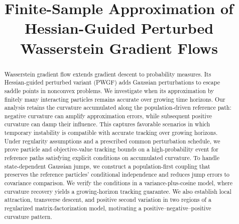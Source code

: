 \documentclass[11pt,a4paper]{article}
\title{Finite-Sample Approximation of Hessian-Guided Perturbed Wasserstein Gradient Flows}
\author{}
\date{}
\begin{document}
\maketitle

\begin{abstract}
Wasserstein gradient flow extends gradient descent to probability measures.
Its Hessian-guided perturbed variant (PWGF) adds Gaussian perturbations to
escape saddle points in nonconvex problems.
We investigate when its approximation by finitely many interacting particles
remains accurate over growing time horizons. Our analysis retains the curvature accumulated along
the population-driven reference path: negative curvature can amplify approximation
errors, while subsequent positive curvature can damp their influence. This
captures favorable scenarios in which temporary instability is compatible with
accurate tracking over growing horizons. Under regularity assumptions and a
prescribed common perturbation schedule, we prove particle and objective-value
tracking bounds on a high-probability event for reference paths satisfying
explicit conditions on accumulated curvature. To handle state-dependent Gaussian
jumps, we construct a population-first coupling that preserves the reference
particles' conditional independence and reduces jump errors to covariance
comparison. We verify the conditions in a variance-plus-cosine model, where
curvature recovery yields a growing-horizon tracking guarantee. We also establish local attraction, transverse
descent, and positive second variation in two regions of a regularized
matrix-factorization model, motivating a positive--negative--positive curvature
pattern.
\end{abstract}








\appendix






\end{document}
